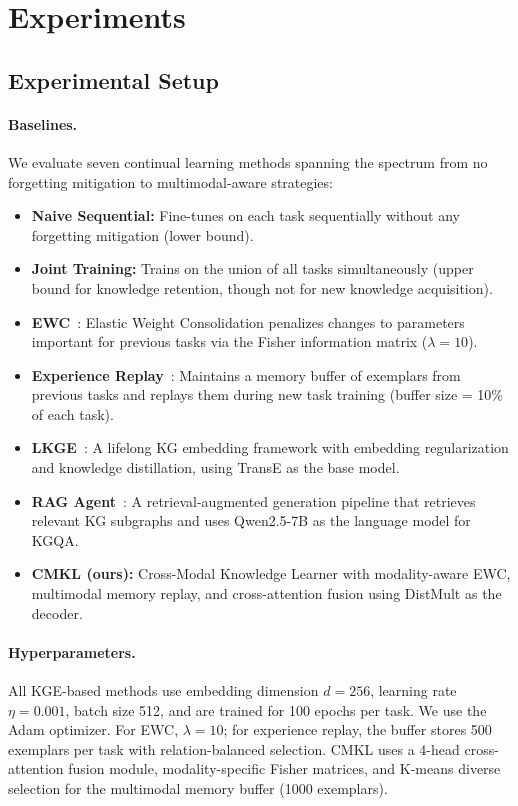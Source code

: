 \section{Experiments}
\label{sec:experiments}

\subsection{Experimental Setup}
\label{sec:setup}

\paragraph{Baselines.}
We evaluate seven continual learning methods spanning the spectrum from no forgetting mitigation to multimodal-aware strategies:
\begin{itemize}
    \item \textbf{Naive Sequential:} Fine-tunes on each task sequentially without any forgetting mitigation (lower bound).
    \item \textbf{Joint Training:} Trains on the union of all tasks simultaneously (upper bound for knowledge retention, though not for new knowledge acquisition).
    \item \textbf{EWC}~\citep{Kirkpatrick2017}: Elastic Weight Consolidation penalizes changes to parameters important for previous tasks via the Fisher information matrix ($\lambda = 10$).
    \item \textbf{Experience Replay}~\citep{Rolnick2019}: Maintains a memory buffer of exemplars from previous tasks and replays them during new task training (buffer size = 10\% of each task).
    \item \textbf{LKGE}~\citep{Cui2023}: A lifelong KG embedding framework with embedding regularization and knowledge distillation, using TransE as the base model.
    \item \textbf{RAG Agent}~\citep{Lewis2020}: A retrieval-augmented generation pipeline that retrieves relevant KG subgraphs and uses Qwen2.5-7B as the language model for KGQA.
    \item \textbf{CMKL (ours):} Cross-Modal Knowledge Learner with modality-aware EWC, multimodal memory replay, and cross-attention fusion using DistMult as the decoder.
\end{itemize}

\paragraph{Hyperparameters.}
All KGE-based methods use embedding dimension $d = 256$, learning rate $\eta = 0.001$, batch size 512, and are trained for 100 epochs per task.
We use the Adam optimizer.
For EWC, $\lambda = 10$; for experience replay, the buffer stores 500 exemplars per task with relation-balanced selection.
CMKL uses a 4-head cross-attention fusion module, modality-specific Fisher matrices, and K-means diverse selection for the multimodal memory buffer (1000 exemplars).

